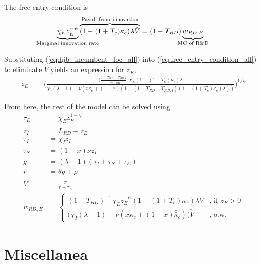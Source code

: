 \documentclass[11pt,english]{article}
\theoremstyle{remark}
\begin{document}
The free entry condition is
\begin{align}
\underbrace{\chi_E z_E^{-\psi}}_{\mathclap{\text{Marginal innovation rate}}} \overbrace{(1-(1+T_e)\kappa_e) \lambda \tilde{V}}^{\mathclap{\text{Payoff from innovation}}} &= (1-T_{RD})\underbrace{w_{RD,E}}_{\mathclap{\text{MC of R\&D}}} \label{eq:free_entry_condition_all}
\end{align}

Substituting (\ref{eq:hjb_incumbent_foc_all}) into (\ref{eq:free_entry_condition_all}) to eliminate $\tilde{V}$ yields an expression for $z_E$, 
\begin{align}
z_E &= \Bigg( \frac{\Big(\frac{1-T_{RD} -T_{RD,I}}{1-T_{RD}} \Big)\chi_E (1-(1+T_e)\kappa_{e}) \lambda}{\chi_I(\lambda -1) - \nu (x\kappa_c + (1-x)(1 - (1-T_{RD} - T_{RD,I})(1-(1+T_e)\kappa_e)\lambda)) } \Bigg)^{1/\psi} \label{eq:effort_entrant_all}
\end{align}

From here, the rest of the model can be solved using
\begin{align}
\tau_E &= \chi_E z_E^{1-\psi} \\
z_I &= \bar{L}_{RD} - z_E \label{eq:labor_resource_constraint_all}\\ 
\tau_I &= \chi_I z_I \\
\tau_S &= (1-x) \nu z_I \\
g &= (\lambda - 1) (\tau_I + \tau_S + \tau_E) \\
r &= \theta g + \rho \\
\tilde{V} &= \frac{\tilde{\pi}}{r + \tau_E} \\ 
w_{RD,E} &= \begin{cases}
(1-T_{RD})^{-1}\chi_E z_E^{-\psi} (1-(1+T_e)\kappa_e) \lambda \tilde{V} &\textrm{, if } z_E > 0\\
\Big( \chi_I(\lambda -1) - \nu (x\kappa_c + (1-x)\bar{\bar{\kappa}}_c)\Big) \tilde{V} &\textrm{, o.w.}
\end{cases} \label{eq:wage_rd_labor_all}
\end{align}





\appendix

\section{Miscellanea}
\end{document}
